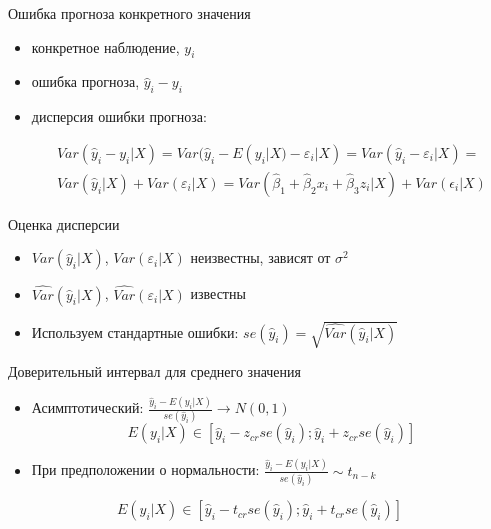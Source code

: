 \documentclass[ignorenonframetext,]{beamer}
\newcommand{\e}{\varepsilon}
\newcommand{\hy}{\hat{y}}
\begin{document}
\begin{frame}{Ошибка прогноза конкретного значения}

\begin{itemize}
\item
  конкретное наблюдение, \(y_i\)
\item
  ошибка прогноза, \(\hy_i - y_i\)
\item
  дисперсия ошибки прогноза:

  \begin{multline} \nonumber
  Var(\hat{y}_i - y_i | X)=Var(\hat{y}_i - E(y_i | X) - \varepsilon_i | X) = Var(\hat{y}_i - \varepsilon_i | X) = \\
  Var(\hat{y}_i|X) + Var( \varepsilon_i | X) = Var(\hat{\beta}_1 +\hat{\beta}_2 x_i + \hat{\beta}_3 z_i | X) + Var(\epsilon_i | X)
  \end{multline}
\end{itemize}

\end{frame}

\begin{frame}{Оценка дисперсии}

\begin{itemize}
\item
  \(Var(\hat{y}_i |X )\), \(Var(\e_i | X)\) неизвестны, зависят от
  \(\sigma^2\)
\item
  \(\widehat{Var}(\hat{y}_i |X )\), \(\widehat{Var}(\e_i | X)\) известны
\item
  Используем стандартные ошибки:
  \(se(\hat{y}_i) = \sqrt{\widehat{Var}(\hat{y}_i |X )}\)
\end{itemize}

\end{frame}

\begin{frame}{Доверительный интервал для среднего значения}

\begin{itemize}
\item
  Асимптотический:
  \(\frac{\hat{y}_i - E(y_i | X)}{se(\hat{y}_i)} \to N(0,1)\) \[
  E(y_i | X) \in [\hat{y}_i - z_{cr} se(\hat{y}_i);\hat{y}_i + z_{cr} se(\hat{y}_i) ]
  \]
\item
  При предположении о нормальности:
  \(\frac{\hat{y}_i - E(y_i | X)}{se(\hat{y}_i)} \sim t_{n-k}\)
\end{itemize}

\[
E(y_i | X) \in [\hat{y}_i - t_{cr} se(\hat{y}_i);\hat{y}_i + t_{cr} se(\hat{y}_i) ]
\]

\end{frame}
\end{document}
